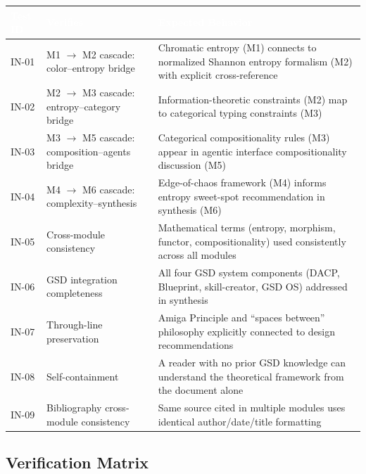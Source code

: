 \documentclass[11pt,letterpaper]{article}
\newcommand{\tableheader}[1]{\textbf{\sffamily\textcolor{white}{#1}}}
\begin{document}
\begin{center}
\begin{tabularx}{\textwidth}{C{1.5cm}L{5cm}X}
\toprule
{}
\tableheader{Test ID} & \tableheader{Verifies} & \tableheader{Expected Behavior} \\
\midrule
IN-01 & M1 $\to$ M2 cascade: color--entropy bridge & Chromatic entropy (M1) connects to normalized Shannon entropy formalism (M2) with explicit cross-reference \\
IN-02 & M2 $\to$ M3 cascade: entropy--category bridge & Information-theoretic constraints (M2) map to categorical typing constraints (M3) \\
IN-03 & M3 $\to$ M5 cascade: composition--agents bridge & Categorical compositionality rules (M3) appear in agentic interface compositionality discussion (M5) \\
IN-04 & M4 $\to$ M6 cascade: complexity--synthesis & Edge-of-chaos framework (M4) informs entropy sweet-spot recommendation in synthesis (M6) \\
IN-05 & Cross-module consistency & Mathematical terms (entropy, morphism, functor, compositionality) used consistently across all modules \\
IN-06 & GSD integration completeness & All four GSD system components (DACP, Blueprint, skill-creator, GSD OS) addressed in synthesis \\
IN-07 & Through-line preservation & Amiga Principle and ``spaces between'' philosophy explicitly connected to design recommendations \\
IN-08 & Self-containment & A reader with no prior GSD knowledge can understand the theoretical framework from the document alone \\
IN-09 & Bibliography cross-module consistency & Same source cited in multiple modules uses identical author/date/title formatting \\
\bottomrule
\end{tabularx}
\end{center}

\subsection{Verification Matrix}
\end{document}
